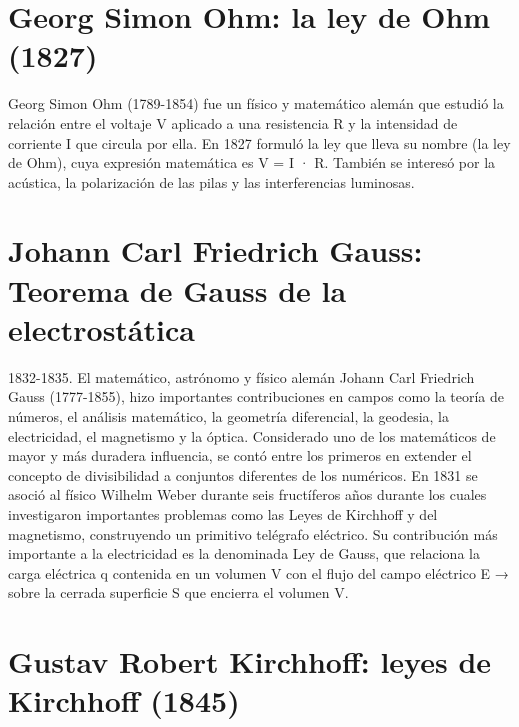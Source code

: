 \documentclass{article}
\begin{document}
\section{Georg Simon Ohm: la ley de Ohm (1827)}

Georg Simon Ohm (1789-1854) fue un físico y matemático alemán que estudió la relación entre el voltaje V aplicado a una resistencia R y la intensidad de corriente I que circula por ella. En 1827 formuló la ley que lleva su nombre (la ley de Ohm), cuya expresión matemática es V = I · R. También se interesó por la acústica, la polarización de las pilas y las interferencias luminosas. \citep{HDE}\\



\section{Johann Carl Friedrich Gauss: Teorema de Gauss de la electrostática}

1832-1835. El matemático, astrónomo y físico alemán Johann Carl Friedrich Gauss (1777-1855), hizo importantes contribuciones en campos como la teoría de números, el análisis matemático, la geometría diferencial, la geodesia, la electricidad, el magnetismo y la óptica. Considerado uno de los matemáticos de mayor y más duradera influencia, se contó entre los primeros en extender el concepto de divisibilidad a conjuntos diferentes de los numéricos. En 1831 se asoció al físico Wilhelm Weber durante seis fructíferos años durante los cuales investigaron importantes problemas como las Leyes de Kirchhoff y del magnetismo, construyendo un primitivo telégrafo eléctrico. Su contribución más importante a la electricidad es la denominada Ley de Gauss, que relaciona la carga eléctrica q contenida en un volumen V con el flujo del campo eléctrico E → {} {} sobre la cerrada superficie S que encierra el volumen V.\citep{HDE}\\

\section{Gustav Robert Kirchhoff: leyes de Kirchhoff (1845)}
\end{document}
